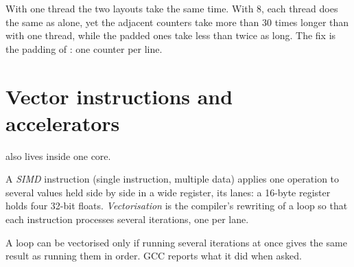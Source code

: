 \label{lst:b3:parallel-programming:false-sharing}

\label{out:b3:parallel-programming:false-sharing}

With one thread the two layouts take the same time. With 8, each thread does the same  as alone, yet the adjacent counters take more than 30 times longer than with one thread, while the padded ones take less than twice as long. The fix is the padding of : one counter per line.

\section{Vector instructions and accelerators}\label{sec:b3:parallel-programming:simd}

 also lives inside one core.

\begin{definition}\label{def:b3:parallel-programming:simd}
A \emph{SIMD} instruction (single instruction, multiple data) applies one operation to several values held side by side in a wide register, its lanes: a 16-byte register holds four 32-bit floats. \emph{Vectorisation} is the compiler's rewriting of a loop so that each instruction processes several iterations, one per lane.
\end{definition}

A loop can be vectorised only if running several iterations at once gives the same result as running them in order. GCC reports what it did when asked.

\label{lst:b3:parallel-programming:saxpy}

\label{out:b3:parallel-programming:vec}

